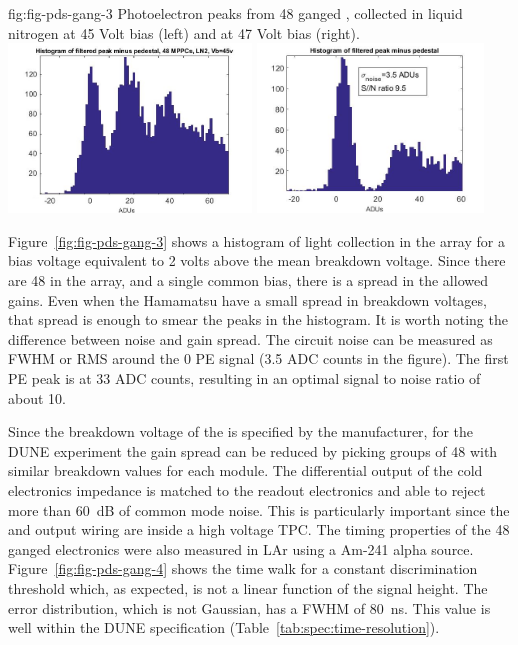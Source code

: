 \begin{dunefigure}
 {fig:fig-pds-gang-3}
 {Photoelectron peaks from 48 ganged , collected in liquid nitrogen at 45 Volt bias (left) and at 47 Volt bias (right).}
\includegraphics[height=4.5cm]{graphics/pds-gang48-45v.jpg}
\includegraphics[height=4.5cm]{graphics/pds-gang48-47v.jpg}
\end{dunefigure}

Figure~\ref{fig:fig-pds-gang-3} shows a histogram of light collection in the array for a bias voltage equivalent to 2 volts above the mean breakdown voltage. Since there are 48  in the array, and a single common bias, there is a spread in the allowed gains. Even when the Hamamatsu  have a small spread in breakdown voltages, that spread is enough to smear the peaks in the histogram. It is worth noting the difference between noise and gain spread. The circuit noise can be measured as FWHM or RMS around the 0 PE signal (3.5 ADC counts in the figure). The first PE peak is at 33 ADC counts, resulting in an optimal signal to noise ratio of about 10.

Since the breakdown voltage of the  is specified by the manufacturer, for the DUNE experiment the gain spread can be reduced by picking groups of 48  with similar breakdown values for each module. The differential output of the cold electronics impedance is matched to the readout electronics and able to reject more than \SI{60}{dB} of common mode noise. This is particularly important since the  and output wiring are inside a high voltage TPC. The timing properties of the 48 ganged electronics were also measured 
in LAr using a Am-241 alpha source. 
Figure~\ref{fig:fig-pds-gang-4} shows the time walk for a constant discrimination threshold which, 
as expected, is not a linear function of the signal height. The error distribution, which is not Gaussian, has a FWHM of \SI{80}{ns}. This value is well within the DUNE specification (Table~\ref{tab:spec:time-resolution}).

